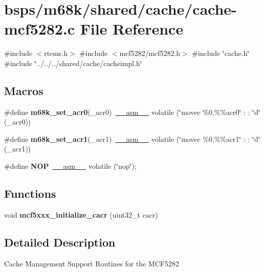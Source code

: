 \hypertarget{cache-mcf5282_8c}{}\section{bsps/m68k/shared/cache/cache-\/mcf5282.c File Reference}
\label{cache-mcf5282_8c}
{\ttfamily \#include $<$rtems.\+h$>$}\newline
{\ttfamily \#include $<$mcf5282/mcf5282.\+h$>$}\newline
{\ttfamily \#include \char`\"{}cache.\+h\char`\"{}}\newline
{\ttfamily \#include \char`\"{}../../../shared/cache/cacheimpl.\+h\char`\"{}}\newline
\subsection*{Macros}
\begin{DoxyCompactItemize}
\item 
\mbox{\label{cache-mcf5282_8c_adf2928ccce80336b63b0d4a7724deeea}} 
\#define {\bfseries m68k\+\_\+set\+\_\+acr0}(\+\_\+acr0)~\mbox{\hyperlink{group__RTEMSScoreCPUSPARC_ga82257d4fc068f4b21b029dd69d276839}{\+\_\+\+\_\+asm\+\_\+\+\_\+}} volatile (\char`\"{}movec \%0,\%\%acr0\char`\"{} \+: \+: \char`\"{}d\char`\"{} (\+\_\+acr0))
\item 
\mbox{\label{cache-mcf5282_8c_ace1f131e12b3bae9646289c682c1558e}} 
\#define {\bfseries m68k\+\_\+set\+\_\+acr1}(\+\_\+acr1)~\mbox{\hyperlink{group__RTEMSScoreCPUSPARC_ga82257d4fc068f4b21b029dd69d276839}{\+\_\+\+\_\+asm\+\_\+\+\_\+}} volatile (\char`\"{}movec \%0,\%\%acr1\char`\"{} \+: \+: \char`\"{}d\char`\"{} (\+\_\+acr1))
\item 
\mbox{\label{cache-mcf5282_8c_a700f88377bf36711b711f69b06c52f5d}} 
\#define {\bfseries N\+OP}~\mbox{\hyperlink{group__RTEMSScoreCPUSPARC_ga82257d4fc068f4b21b029dd69d276839}{\+\_\+\+\_\+asm\+\_\+\+\_\+}} volatile (\char`\"{}nop\char`\"{});
\end{DoxyCompactItemize}
\subsection*{Functions}
\begin{DoxyCompactItemize}
\item 
\mbox{\label{cache-mcf5282_8c_aad9ecd430d17d15169fe8ec270a89e07}} 
void {\bfseries mcf5xxx\+\_\+initialize\+\_\+cacr} (uint32\+\_\+t cacr)
\end{DoxyCompactItemize}


\subsection{Detailed Description}
Cache Management Support Routines for the M\+C\+F5282 